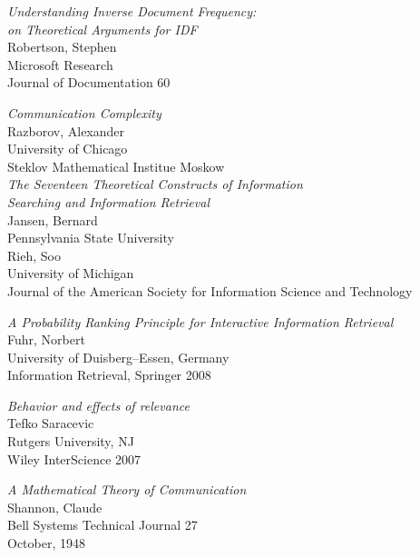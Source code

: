 \documentclass{article}
\newcommand{\bibtitle}[1]{{\it #1}}
\begin{document}
\begin{thebibliography}{99}

        \bibtitle{Understanding Inverse Document Frequency:\\
                    on Theoretical Arguments for IDF} \\
        Robertson, Stephen \\
        Microsoft Research \\
        Journal of Documentation 60

        \bibtitle{Communication Complexity} \\
        Razborov, Alexander \\
        University of Chicago \\
        Steklov Mathematical Institue Moskow \\

        \bibtitle{The Seventeen Theoretical Constructs of Information\\
            Searching and Information Retrieval} \\
        Jansen, Bernard \\
        Pennsylvania State University \\
        Rieh, Soo \\
        University of Michigan \\
        Journal of the American Society for 
        Information Science and Technology

        \bibtitle{A Probability Ranking Principle for
            Interactive Information Retrieval} \\
        Fuhr, Norbert \\
        University of Duisberg--Essen, Germany \\
        Information Retrieval, Springer 2008

        \bibtitle{Behavior and effects of relevance}\\
        Tefko Saracevic\\
        Rutgers University, NJ\\
        Wiley InterScience 2007

        \bibtitle{A Mathematical Theory of Communication} \\
        Shannon, Claude\\
        Bell Systems Technical Journal 27\\
        October, 1948


\end{thebibliography}
\end{document}
